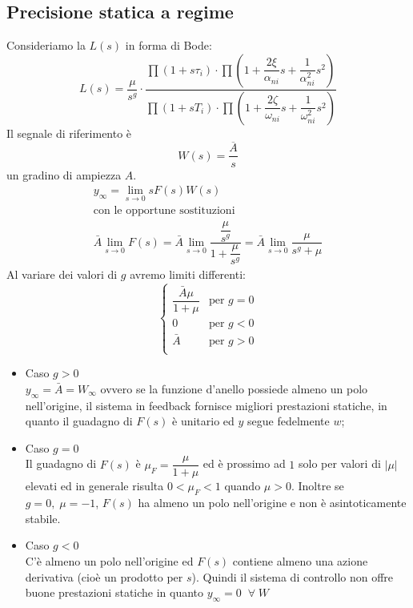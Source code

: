 \documentclass[a4paper]{report}
\begin{document}
\subsection{Precisione statica a regime}
Consideriamo la $L(s)$ in forma di Bode:
\[
L(s) = \dfrac{\mu}{s^g} \cdot \dfrac{\prod (1 + s\tau_i) \cdot \prod
  (1 + \dfrac{2 \xi}{\alpha_{ni}}s + \dfrac{1}{\alpha_{ni}^2}
  s^2)}{\prod (1 + sT_i) \cdot \prod \left(1 + \dfrac{2
    \zeta}{\omega_{ni}}s + \dfrac{1}{\omega_{ni}^2}s^2\right)}
\]
Il segnale di riferimento \`e
\[
W(s) = \dfrac{\overline{A}}{s}
\]
un gradino di ampiezza $A$.
\[
\begin{array}{l}
  y_{\infty} = \lim_{s \to 0} sF(s) W(s)\\
  \textrm{con le opportune sostituzioni}\\
  \bar{A}\lim_{s \to 0} F(s) = \bar{A}\lim_{s \to 0}\dfrac{\dfrac{\mu}{s^g}}{1 +
    \dfrac{\mu}{s^g}} = \bar{A}\lim_{s \to 0} \dfrac{\mu}{s^g + \mu}
\end{array}
\]
Al variare dei valori di $g$ avremo limiti differenti:
\[
\left\{
\begin{array}{ll}
  \dfrac{\bar{A}\mu}{1 + \mu} & \textrm{per } g = 0\\
  0 & \textrm{per } g < 0\\
  \bar{A} & \textrm{per } g > 0\\
\end{array}
\right.
\]
\begin{itemize}
\item Caso $g > 0$\\
  $y_{\infty} = \bar{A} = W_{\infty}$ ovvero se la funzione d'anello
  possiede almeno un polo nell'origine, il sistema in feedback
  fornisce migliori prestazioni statiche, in quanto il guadagno di
  $F(s)$ \`e unitario ed $y$ segue fedelmente $w$;
\item Caso $g = 0$\\
  Il guadagno di $F(s)$ \`e $\mu_F = \dfrac{\mu}{1 + \mu}$ ed \`e
  prossimo ad $1$ solo per valori di $|\mu|$ elevati ed in generale
  risulta $0 < \mu_F < 1$ quando $\mu > 0$. Inoltre se $g = 0, \; \mu
  = -1$,\; $F(s)$ ha almeno un polo nell'origine e non \`e
  asintoticamente stabile.
\item Caso $g < 0$\\
  C'\`e almeno un polo nell'origine ed $F(s)$ contiene almeno una
  azione derivativa (cio\`e un prodotto per $s$). Quindi il sistema di
  controllo non offre buone prestazioni statiche in quanto $y_{\infty}
  = 0 \;\; \forall \;W$ 
\end{itemize}
\end{document}
